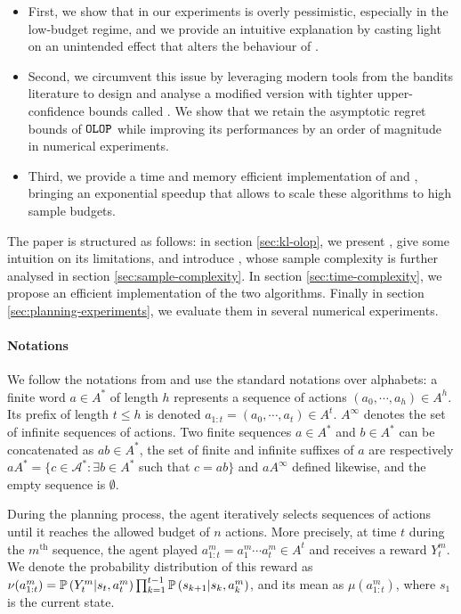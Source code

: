 \begin{itemize}
	\item First, we show that in our experiments \OLOP is overly pessimistic, especially in the low-budget regime, and we provide an intuitive explanation by casting light on an unintended effect that alters the behaviour of \OLOP.
	\item Second, we circumvent this issue by leveraging modern tools from the bandits literature to design and analyse a modified version with tighter upper-confidence bounds called \KLOLOP. We show that we retain the asymptotic regret bounds of $\texttt{OLOP}$ while improving its performances by an order of magnitude in numerical experiments.
	\item Third, we provide a time and memory efficient implementation of \OLOP and \KLOLOP, bringing an exponential speedup that allows to scale these algorithms to high sample budgets.
\end{itemize}

The paper is structured as follows: in section \ref{sec:kl-olop}, we present \OLOP, give some intuition on its limitations, and introduce \KLOLOP, whose sample complexity is further analysed in section \ref{sec:sample-complexity}. In section \ref{sec:time-complexity}, we propose an efficient implementation of the two algorithms. Finally in section \ref{sec:planning-experiments}, we evaluate them in several numerical experiments.

\paragraph{Notations}
We follow the notations from \citep{Bubeck2010} and use the standard notations over alphabets: a finite word $a \in A^*$ of length $h$ represents a sequence of actions $(a_0, \cdots, a_h) \in A^h$. Its prefix of length $t \leq h$ is denoted $a_{1:t} = (a_0,\cdots,a_t) \in A^t$. $A^\infty$ denotes the set of infinite sequences of actions. Two finite sequences $a\in A^*$ and $b\in A^*$ can be concatenated as $ab\in A^*$, the set of finite and infinite suffixes of $a$ are respectively $a A^* = \{c\in\mathcal{A}^*: \exists b\in A^*$ such that $c=ab\}$ and $aA^\infty$ defined likewise, and the empty sequence is $\emptyset$.

During the planning process, the agent iteratively selects sequences of actions until it reaches the allowed budget of $n$ actions. More precisely, at time $t$ during the $m^{\text{th}}$ sequence, the agent played $a^m_{1:t} = a^m_1 \cdots a^m_t \in A^t$ and receives a reward $Y_t^m$. We denote the probability distribution of this reward as $\nu(a_{1:t}^m) = \mathbb{P}\left(Y_t^m | s_t, a^m_t\right) \prod_{k=1}^{t-1} \mathbb{P}\left(s_{k+1} | s_{k}, a_{k}^m\right)$, and its mean as $\mu(a_{1:t}^m)$, where $s_1$ is the current state.

